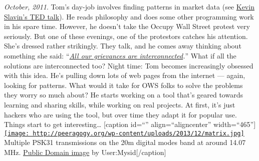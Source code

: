 \emph{October, 2011}. Tom's day-job involves finding patterns in market
data (see
\href{http://www.ted.com/talks/kevin_slavin_how_algorithms_shape_our_world.html}{Kevin
Slavin's TED talk}). He reads philosophy and does some other programming
work in his spare time. However, he doesn't take the Occupy Wall Street
protest very seriously. But one of these evenings, one of the protestors
catches his attention. She's dressed rather strikingly. They talk, and
he comes away thinking about something she said:
``\emph{\href{http://www.nycga.net/files/2011/11/DeclarationFlowchart_v2_large.jpg}{All
our grievances are interconnected}.}'' What if all the solutions are
interconnected too? Night time: Tom becomes increasingly obsessed with
this idea. He's pulling down lots of web pages from the internet ---
again, looking for patterns. What would it take for OWS folks to solve
the problems they worry so much about? He starts working on a tool
that's geared towards learning and sharing skills, while working on real
projects. At first, it's just hackers who are using the tool, but over
time they adapt it for popular use. Things start to get
interesting\ldots{} {[}caption id=``'' align=``aligncenter''
width=``465''{]}\href{http://peeragogy.org/a-pattern-story/matrix/}{\texttt{[image: http://peeragogy.org/wp-content/uploads/2013/12/matrix.jpg]}}
Multiple PSK31 transmissions on the 20m digital modes band at around
14.07 MHz.
\href{https://commons.wikimedia.org/wiki/File:PSK_matrix.jpg}{Public
Domain image} by User:Mysid{[}/caption{]}

